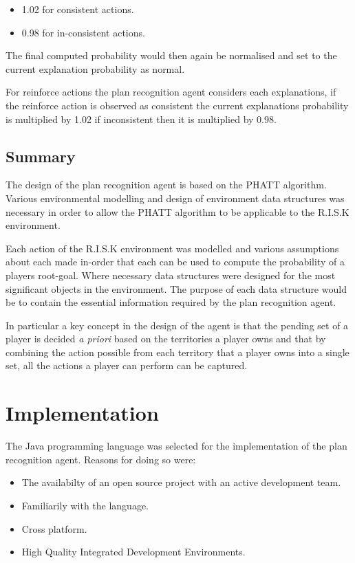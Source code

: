 \documentclass[parskip]{cs4rep}
\begin{document}
\begin{itemize}
\item
1.02 for consistent actions.
\item
0.98 for in-consistent actions.
\end{itemize}

The final computed probability would then again be normalised and set to the current explanation probability as normal.

For reinforce actions the plan recognition agent considers each explanations, if the reinforce action is observed as consistent the current explanations probability is multiplied by 1.02 if inconsistent then it is multiplied by 0.98. 

\section{Summary}

The design of the plan recognition agent is based on the PHATT algorithm. Various environmental modelling and design of environment data structures was necessary in order to allow the PHATT algorithm to be applicable to the R.I.S.K environment. 

Each action of the R.I.S.K environment was modelled and various assumptions about each made in-order that each can be used to compute the probability of a players root-goal. Where necessary data structures were designed for the most significant objects in the environment. The purpose of each data structure would be to contain the essential information required by the plan recognition agent.

In particular a key concept in the design of the agent is that the pending set of a player is decided \textit{a priori} based on the territories a player owns and that by combining the action possible from each territory that a player owns into a single set, all the actions a player can perform can be captured.

\chapter{Implementation}

The Java programming language was selected for the implementation of the plan recognition agent. Reasons for doing so were:

\begin{itemize}
\item
The availabilty of an open source project with an active development team.
\item
Familiarily with the language.
\item
Cross platform.
\item
High Quality Integrated Development Environments.
\end{itemize}
\end{document}

